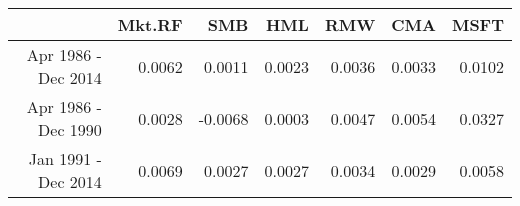 \begin{tabular}{rrrrrrr}
	\hline
	& Mkt.RF & SMB & HML & RMW & CMA & MSFT \\ 
	\hline
 Apr 1986 - Dec 2014 & 0.0062 & 0.0011 & 0.0023 & 0.0036 & 0.0033 & 0.0102 \\ 
	Apr 1986 - Dec 1990 & 0.0028 & -0.0068 & 0.0003 & 0.0047 & 0.0054 & 0.0327 \\ 
	Jan 1991 - Dec 2014 & 0.0069 & 0.0027 & 0.0027 & 0.0034 & 0.0029 & 0.0058 \\ 
	\hline
\end{tabular}